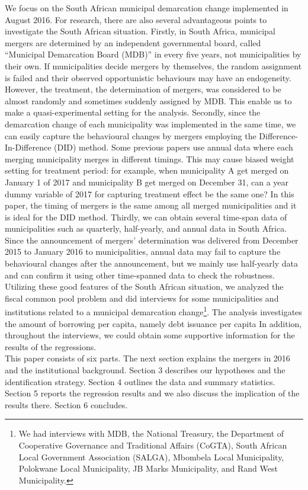 \documentclass[dvipdfmx]{jsarticle}
\begin{document}
\quad We focus on the South African municipal demarcation change implemented in August 2016. For research, there are also several advantageous points to investigate the South African situation. Firstly, in South Africa, municipal mergers are determined by an independent governmental board, called “Municipal Demarcation Board (MDB)” in every five years, not municipalities by their own. If municipalities decide mergers by themselves, the random assignment is failed and their observed opportunistic behaviours may have an endogeneity. However, the treatment, the determination of mergers, was considered to be almost randomly and sometimes suddenly assigned by MDB. This enable us to make a quasi-experimental setting for the analysis. Secondly, since the demarcation change of each municipality was implemented in the same time, we can easily capture the behavioural changes by mergers employing the Difference-In-Difference (DID) method. Some previous papers use annual data where each merging municipality merges in different timings. This may cause biased weight setting for treatment period: for example, when municipality A get merged on January 1 of 2017 and municipality B get merged on December 31, can a year dummy variable of 2017 for capturing treatment effect be the same one? In this paper, the timing of mergers is the same among all merged municipalities and it is ideal for the DID method. Thirdly, we can obtain several time-span data of municipalities such as quarterly, half-yearly, and annual data in South Africa. Since the announcement of mergers' determination was delivered from December 2015 to January 2016 to municipalities, annual data may fail to capture the behavioural changes after the announcement, but we mainly use half-yearly data and can confirm it using other time-spanned data to check the robustness. \\
\quad Utilizing these good features of the South African situation, we analyzed the fiscal common pool problem and did interviews for some municipalities and institutions related to a municipal demarcation change\footnote{We had interviews with MDB, the National Treasury, the Department of Cooperative Governance and Traditional Affairs (CoGTA), South African Local Government Association (SALGA), Mbombela Local Municipality, Polokwane Local Municipality, JB Marks Municipality, and Rand West Municipality.}. The analysis investigates the amount of borrowing per capita, namely debt issuance per capita  In addition, throughout the interviews, we could obtain some supportive information for the results of the regressions.\\
\quad This paper consists of six parts. The next section explains the mergers in 2016 and the institutional background. Section 3 describes our hypotheses and the identification strategy. Section 4 outlines the data and summary statistics. Section 5 reports the regression results and we also discuss the implication of the results there. Section 6 concludes.
\end{document}
